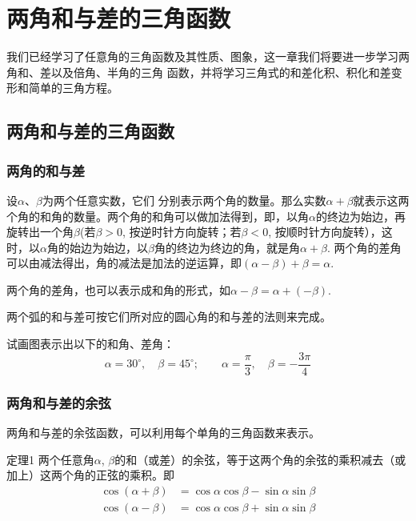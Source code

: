 \chapter{两角和与差的三角函数}
我们已经学习了任意角的三角函数及其性质、图象，这一章我们将要进一步学习两角和、差以及倍角、半角的三角
函数，并将学习三角式的和差化积、积化和差变形和简单的三角方程。
\section{两角和与差的三角函数}
\subsection{两角的和与差}
设$\alpha$、$\beta$为两个任意实数，它们
分别表示两个角的数量。那么实数$\alpha+\beta$就表示这两个角的和角的数量。两个角的和角可以做加法得到，即，以角$\alpha $的终边为始边，再旋转出一个角$\beta$(若$\beta>0$, 按逆时针方向旋转；若$\beta<0$, 按顺时针方向旋转），这时，以$\alpha $角的始边为始边，以$\beta$角的终边为终边的角，就是角$\alpha +\beta$. 两个角的差角可以由减法得出，角的减法是加法的逆运算，即$(\alpha -\beta)+\beta=\alpha$.

两个角的差角，也可以表示成和角的形式，如$\alpha -\beta=\alpha + (-\beta)$.

两个弧的和与差可按它们所对应的圆心角的和与差的法则来完成。

\begin{ex}
    试画图表示出以下的和角、差角：
    \[\alpha=30^{\circ},\quad \beta=45^{\circ}; \qquad \alpha=\frac{\pi}{3},\quad \beta=-\frac{3\pi}{4}   \]
\end{ex}

\subsection{两角和与差的余弦}
两角和与差的余弦函数，可以利用每个单角的三角函数来表示。

\begin{blk}{定理1}
    两个任意角$\alpha$, $\beta$的和（或差）的余弦，等于这两个角的余弦的乘积减去（或加上）这两个角的正弦的乘积。即
\begin{align}
    \cos (\alpha+\beta) &=\cos\alpha\cos\beta-\sin\alpha\sin\beta\\
\cos (\alpha-\beta) &=\cos\alpha\cos\beta+\sin\alpha\sin\beta
\end{align}
\end{blk}
 
